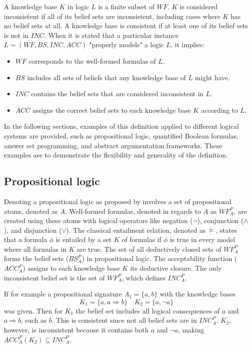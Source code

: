 A knowledge base \(K\) in logic \(L\) is a finite subset of \(WF\).
\(K\) is considered inconsistent if all of its belief sets are inconsistent, including cases where \(K\) has no belief sets at all.
A knowledge base is consistent if at least one of its belief sets is not in \(INC\).
When it is stated that a particular instance \(L = (WF, BS, INC, ACC)\) "properly models" a logic \(L\), it implies:
\begin{itemize}
      \item \(WF\) corresponds to the well-formed formulas of \(L\).
      \item \(BS\) includes all sets of beliefs that any knowledge base of \(L\) might have.
      \item \(INC\) contains the belief sets that are considered inconsistent in \(L\).
      \item \(ACC\) assigns the correct belief sets to each knowledge base \(K\) according to \(L\).
\end{itemize}

In the following sections, examples of this definition applied to different logical systems are provided, such as propositional logic, quantified Boolean formulas, answer set programming, and abstract argumentation frameworks. These examples are to demonstrate the flexibility and generality of the definition.

\subsection{Propositional logic}
Denoting a propositional logic as proposed by \cite{gelfond_classical_1991} involves a set of propositional atoms, denoted as \(A\).
Well-formed formulas, denoted in regards to \(A\) as \(WF^P_A\), are created using these atoms with logical operators like negation (\(\neg\)), conjunction (\(\land\)), and disjunction (\(\lor\)).
The classical entailment relation, denoted as \(\models\), states that a formula \(\phi\) is entailed by a set \(K\) of formulas if \(\phi\) is true in every model where all formulas in \(K\) are true.
The set of all deductively closed sets of \(WF^P_A\) forms the belief sets (\(BS^P_A\)) in propositional logic.
The acceptability function (\(ACC^P_A\)) assigns to each knowledge base \(K\) its deductive closure.
The only inconsistent belief set is the set of \(WF^P_A\), which defines \(INC^P_A\).

If for example a propositional signature \(A_1 = \{a,b\}\) with the knowledge bases
\[K_1 = \{a, a \Rightarrow b\} \quad K_2 = \{a, \neg a\}\]
was given.
Then for \(K_1\) the belief set includes all logical consequences of \(a\) and \(a \Rightarrow b\), such as \(b\).
This is consistent since not all belief sets are in \(INC^P_A\).
\(K_2\), however, is inconsistent because it contains both \(a\) and \(\neg a\), making \(ACC^P_A(K_2) \subseteq INC^P_A\).

